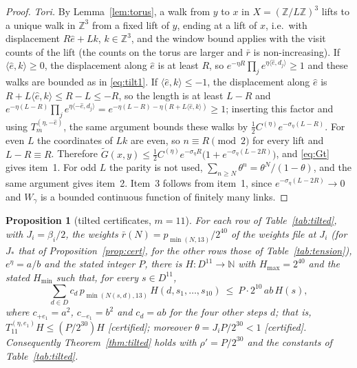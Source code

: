 \documentclass[11pt,a4paper]{article}
\theoremstyle{plain}
\newtheorem{proposition}[theorem]{Proposition}
\theoremstyle{remark}
\numberwithin{equation}{section}
\newcommand{\Z}{\mathbb{Z}}
\newcommand{\N}{\mathbb{N}}
\newcommand{\rb}{\bar r}
\newcommand{\Gt}{\widetilde G}
\newcommand{\st}[1]{\textsf{[#1]}}
\begin{document}
\begin{proof}
\emph{Tori.} By Lemma~\ref{lem:torus}, a walk from $y$ to $x$ in $X=(\Z/L\Z)^3$ lifts to a unique walk in $\Z^3$ from a fixed lift of
$y$, ending at a lift of $x$, i.e.\ with displacement $R\hat e+Lk$, $k\in\Z^3$, and the window bound applies with the visit counts of the
lift (the counts on the torus are larger and $\rb$ is non-increasing). If $\langle\hat e,k\rangle\ge0$, the displacement along $\hat e$ is
at least $R$, so $e^{-\eta R}\prod_je^{\eta\langle\hat e,d_j\rangle}\ge1$ and these walks are bounded as in \eqref{eq:tilt1}. If
$\langle\hat e,k\rangle\le-1$, the displacement along $\hat e$ is $R+L\langle\hat e,k\rangle\le R-L\le-R$, so the length is at least $L-R$
and $e^{-\eta(L-R)}\prod_je^{\eta\langle-\hat e,d_j\rangle}=e^{-\eta(L-R)-\eta(R+L\langle\hat e,k\rangle)}\ge1$; inserting this factor and using
$T_m^{(\eta,-\hat e)}$, the same argument bounds these walks by $\frac12C^{(\eta)}e^{-\sigma_\eta(L-R)}$. For even $L$ the coordinates of
$Lk$ are even, so $n\equiv R\pmod2$ for every lift and $L-R\equiv R$. Therefore $\Gt(x,y)\le\frac12C^{(\eta)}e^{-\sigma_\eta R}\big(1+
e^{-\sigma_\eta(L-2R)}\big)$, and \eqref{eq:Gt} gives item~1. For odd $L$ the parity is not used, $\sum_{n\ge N}\theta^n=\theta^N/(1-\theta)$,
and the same argument gives item~2. Item~3 follows from item~1, since $e^{-\sigma_\eta(L-2R)}\to0$ and $W_\gamma$ is a bounded continuous
function of finitely many links.
\end{proof}

\begin{proposition}[tilted certificates, $m=11$]\label{prop:tiltcert}
For each row of Table~\ref{tab:tilted}, with $J_i=\beta_i/2$, the weights $\rb(N)=p_{\min(N,13)}/2^{40}$ of the weights file at $J_i$
(for $J_*$ that of Proposition~\ref{prop:cert}, for the other rows those of Table~\ref{tab:tension}), $e^\eta=a/b$ and the stated
integer $P$, there is $H:D^{11}\to\N$ with $H_{\max}=2^{40}$ and the stated $H_{\min}$ such that, for every $s\in D^{11}$,
\begin{equation}\label{eq:tiltcert}
\sum_{d\in D}c_d\,p_{\min(N(s,d),13)}\,H(d,s_1,\dots,s_{10})\ \le\ P\cdot2^{10}\,ab\,H(s),
\end{equation}
where $c_{+e_1}=a^2$, $c_{-e_1}=b^2$ and $c_d=ab$ for the four other steps $d$; that is, $T_{11}^{(\eta,e_1)}H\le(P/2^{30})H$ \st{certified}; moreover $\theta=J_iP/2^{30}<1$ \st{certified}. Consequently
Theorem~\ref{thm:tilted} holds with $\rho'=P/2^{30}$ and the constants of Table~\ref{tab:tilted}.
\end{proposition}
\end{document}
